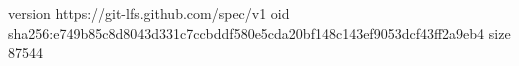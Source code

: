 version https://git-lfs.github.com/spec/v1
oid sha256:e749b85c8d8043d331c7ccbddf580e5cda20bf148c143ef9053dcf43ff2a9eb4
size 87544

